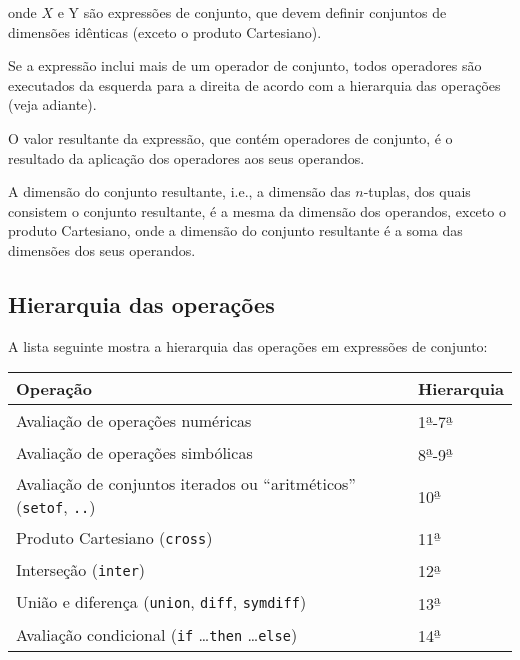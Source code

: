 \documentclass[11pt, brazil]{report}
\begin{document}
\noindent onde $X$ e Y são expressões de conjunto, que devem definir conjuntos
de dimensões idênticas (exceto o produto Cartesiano).

Se a expressão inclui mais de um operador de conjunto, todos operadores
são executados da esquerda para a direita de acordo com a hierarquia das
operações (veja adiante).

O valor resultante da expressão, que contém operadores de conjunto, é
o resultado da aplicação dos operadores aos seus operandos.

A dimensão do conjunto resultante, i.e., a dimensão das $n$-tuplas,
dos quais consistem o conjunto resultante, é a mesma da dimensão dos
operandos, exceto o produto Cartesiano, onde a dimensão do conjunto
resultante é a soma das dimensões dos seus operandos.

%
%
%

\subsection{Hierarquia das operações}

A lista seguinte mostra a hierarquia das operações em expressões de conjunto:


\noindent\hfil
\begin{tabular}{@{}ll@{}}
Operação&Hierarquia\\
\hline
Avaliação de operações numéricas&
1{\textsuperscript{\b{a}}}-7{\textsuperscript{\b{a}}}\\
Avaliação de operações simbólicas&
8{\textsuperscript{\b{a}}}-9{\textsuperscript{\b{a}}}\\
Avaliação de conjuntos iterados ou ``aritméticos'' ({\tt setof}, {\tt..})&
10{\textsuperscript{\b{a}}}\\
Produto Cartesiano ({\tt cross})&
11{\textsuperscript{\b{a}}}\\
Interseção ({\tt inter})&
12{\textsuperscript{\b{a}}}\\
União e diferença ({\tt union}, {\tt diff}, {\tt symdiff})&
13{\textsuperscript{\b{a}}}\\
Avaliação condicional ({\tt if} \dots {\tt then} \dots {\tt else})&
14{\textsuperscript{\b{a}}}\\
\end{tabular}
\end{document}
